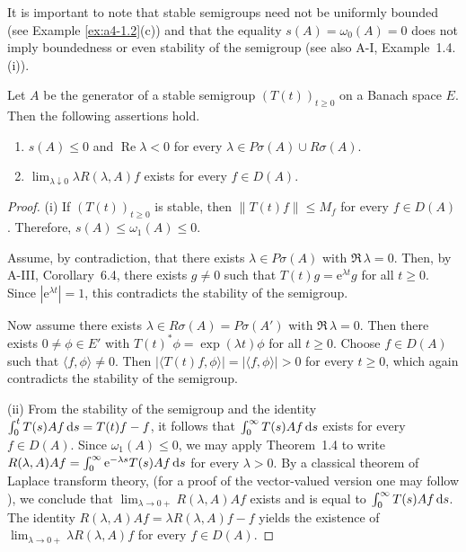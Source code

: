 It is important to note  that stable semigroups need not be uniformly bounded (see Example \ref{ex:a4-1.2}(c)) and that the equality $ s(A) = \omega_{0}(A) = 0 $ does not imply boundedness or even stability of the semigroup (see also A-I, Example~1.4.(i)).
\begin{theorem} \label{thm:a4-1.13} Let $ A $ be the generator of a stable semigroup $ (T(t))_{t \geq 0} $ on a Banach space $ E $. Then the following assertions hold.
\begin{enumerate}[\upshape (i)]
    \item 
    $ s(A) \leq 0 $ and $ \operatorname{Re} \lambda < 0 $ for every $ \lambda \in P\sigma (A) \cup R\sigma(A) $.
    
    \item 
    $ \lim_{\lambda \downarrow 0} \lambda R(\lambda, A) f $ exists for every $ f \in D(A) $.
\end{enumerate}
\end{theorem}
\begin{proof} (i) If $ (T(t))_{t \geq 0} $ is stable, then $ \|T(t) f\| \leq M_f $ for every $ f \in D(A) $. Therefore, $ s(A) \leq \omega_1(A) \leq 0 $. 

Assume, by contradiction, that there exists $ \lambda \in P\sigma(A) $ with $ \Re\,\lambda = 0 $. 
Then, by A-III, Corollary~6.4, there exists $ g \neq 0 $ such that $ T(t) g = \mathrm{e}^{\lambda t} g $ for all $ t \geq 0 $. Since $ |\mathrm{e}^{\lambda t}| = 1 $, this contradicts the stability of the semigroup. 

Now assume there exists $ \lambda \in R\sigma(A) = P\sigma(A') $ with $ \Re\,\lambda = 0 $. 
Then there exists $ 0 \neq \phi \in E' $ with $ T(t)^* \phi = \exp(\lambda t) \phi $ for all $ t \geq 0 $. Choose $ f \in D(A) $ such that $ \langle f, \phi \rangle \neq 0 $. 
Then $ |\langle T(t) f, \phi \rangle| = | \langle f, \phi \rangle| > 0 $ for every $ t \geq 0 $, which again contradicts the stability of the semigroup.

(ii) From the stability of the semigroup and the identity   $\int_{0}^{t} T(s) A f  \mathop{}\!\mathrm{d}{s} = T(t) f - f$, it follows that  
$\int_{0}^{\infty} T(s) A f  \mathop{}\!\mathrm{d}{s}$ exists for every $ f \in D(A) $.  
Since $ \omega_1(A) \leq 0 $, we may apply Theorem~1.4 to write  $ R(\lambda, A) A f = \int_{0}^{\infty} \mathrm{e}^{-\lambda s} T(s) A f  \mathop{}\!\mathrm{d}{s} $ for every $ \lambda > 0 $. 
By a classical theorem of Laplace transform theory, (for a proof of the vector-valued version one may follow \citet[p.196]{widder:1971}), we conclude that $\lim_{\lambda \to 0+} R(\lambda,A)Af$ exists
and is equal to $\int_{0}^{\infty} T(s)Af  \mathop{}\!\mathrm{d}{s}$. 
The identity $R(\lambda,A)Af = \lambda R(\lambda,A)f - f$
yields the existence of $\lim_{\lambda \to 0+} \lambda R(\lambda,A)f$ for every $f \in D(A)$.
\end{proof}
